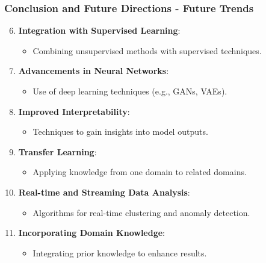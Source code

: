 \documentclass[aspectratio=169]{beamer}
\begin{document}
\begin{frame}[fragile]
    \frametitle{Conclusion and Future Directions - Future Trends}
    \begin{enumerate}
        \setcounter{enumi}{5} %
        \item \textbf{Integration with Supervised Learning}:
        \begin{itemize}
            \item Combining unsupervised methods with supervised techniques.
        \end{itemize}

        \item \textbf{Advancements in Neural Networks}:
        \begin{itemize}
            \item Use of deep learning techniques (e.g., GANs, VAEs).
        \end{itemize}

        \item \textbf{Improved Interpretability}:
        \begin{itemize}
            \item Techniques to gain insights into model outputs.
        \end{itemize}

        \item \textbf{Transfer Learning}:
        \begin{itemize}
            \item Applying knowledge from one domain to related domains.
        \end{itemize}

        \item \textbf{Real-time and Streaming Data Analysis}:
        \begin{itemize}
            \item Algorithms for real-time clustering and anomaly detection.
        \end{itemize}

        \item \textbf{Incorporating Domain Knowledge}:
        \begin{itemize}
            \item Integrating prior knowledge to enhance results.
        \end{itemize}
    \end{enumerate}
\end{frame}
\end{document}
